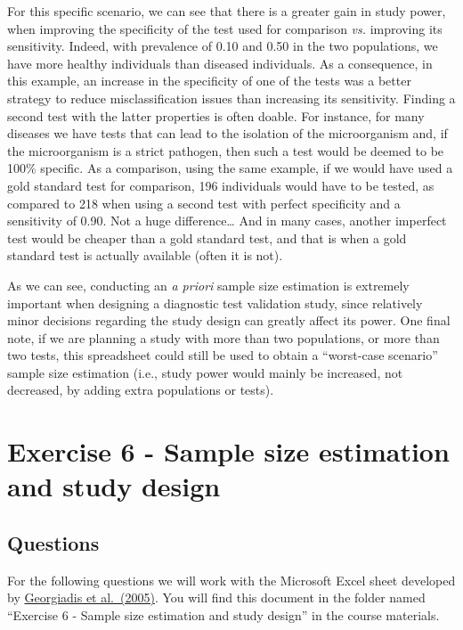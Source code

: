 \documentclass[
]{book}
\begin{document}
For this specific scenario, we can see that there is a greater gain in study power, when improving the specificity of the test used for comparison \emph{vs.} improving its sensitivity. Indeed, with prevalence of 0.10 and 0.50 in the two populations, we have more healthy individuals than diseased individuals. As a consequence, in this example, an increase in the specificity of one of the tests was a better strategy to reduce misclassification issues than increasing its sensitivity. Finding a second test with the latter properties is often doable. For instance, for many diseases we have tests that can lead to the isolation of the microorganism and, if the microorganism is a strict pathogen, then such a test would be deemed to be 100\% specific. As a comparison, using the same example, if we would have used a gold standard test for comparison, 196 individuals would have to be tested, as compared to 218 when using a second test with perfect specificity and a sensitivity of 0.90. Not a huge difference\ldots{} And in many cases, another imperfect test would be cheaper than a gold standard test, and that is when a gold standard test is actually available (often it is not).

As we can see, conducting an \emph{a priori} sample size estimation is extremely important when designing a diagnostic test validation study, since relatively minor decisions regarding the study design can greatly affect its power. One final note, if we are planning a study with more than two populations, or more than two tests, this spreadsheet could still be used to obtain a ``worst-case scenario'' sample size estimation (i.e., study power would mainly be increased, not decreased, by adding extra populations or tests).

\chapter{Exercise 6 - Sample size estimation and study design}\label{exercise-6---sample-size-estimation-and-study-design}

\section{Questions}\label{questions-5}

For the following questions we will work with the Microsoft Excel sheet developed by \href{https://www.sciencedirect.com/science/article/pii/S0167587705001674?via\%3Dihub}{Georgiadis et al.~(2005)}. You will find this document in the folder named ``Exercise 6 - Sample size estimation and study design'' in the course materials.
\end{document}
